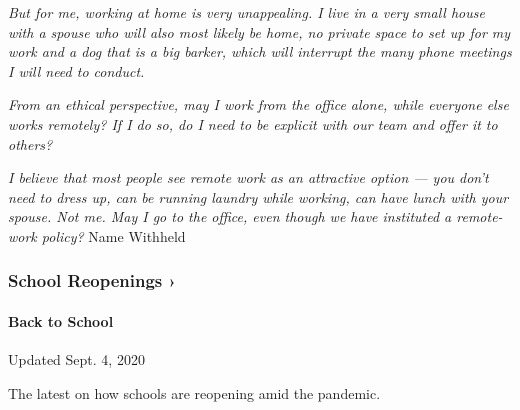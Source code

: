 \emph{But for me, working at home is very unappealing. I live in a very
small house with a spouse who will also most likely be home, no private
space to set up for my work and a dog that is a big barker, which will
interrupt the many phone meetings I will need to conduct.}

\emph{From an ethical perspective, may I work from the office alone,
while everyone else works remotely? If I do so, do I need to be explicit
with our team and offer it to others?}

\emph{I believe that most people see remote work as an attractive option
--- you don't need to dress up, can be running laundry while working,
can have lunch with your spouse. Not me. May I go to the office, even
though we have instituted a remote-work policy?} Name Withheld

\href{https://www.nytimes3xbfgragh.onion/spotlight/schools-reopening?action=click\&pgtype=Article\&state=default\&region=MAIN_CONTENT_3\&context=storylines_keepup}{}

\hypertarget{school-reopenings-}{%
\subsubsection{School Reopenings ›}\label{school-reopenings-}}

\hypertarget{back-to-school}{%
\paragraph{Back to School}\label{back-to-school}}

Updated Sept. 4, 2020

The latest on how schools are reopening amid the pandemic.

